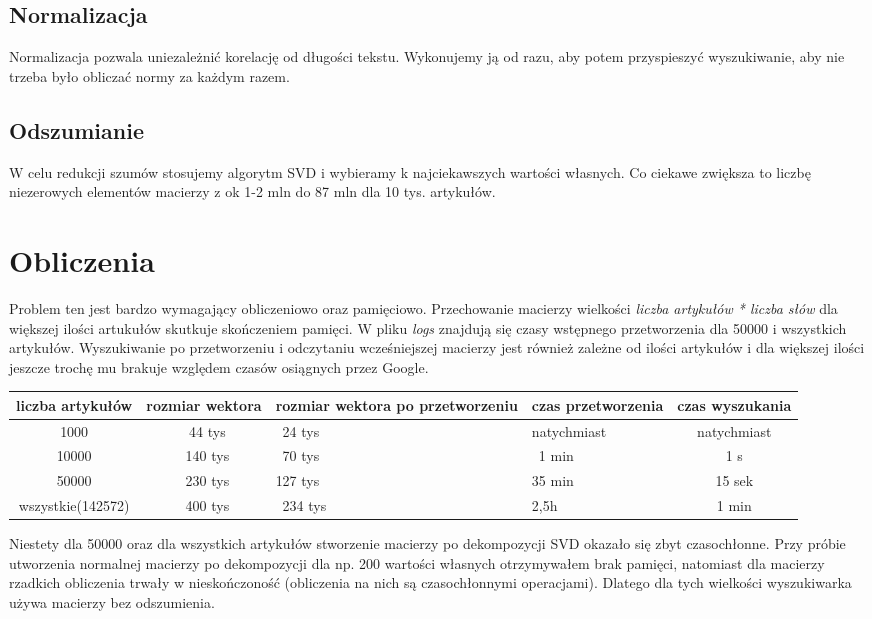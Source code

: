 \documentclass{article}
\begin{document}
\subsection{Normalizacja}
Normalizacja pozwala uniezależnić korelację od długości tekstu. Wykonujemy ją od razu, aby potem przyspieszyć wyszukiwanie, aby nie trzeba było obliczać normy za każdym razem.
\subsection{Odszumianie}
W celu redukcji szumów stosujemy algorytm SVD i wybieramy k najciekawszych wartości własnych. Co ciekawe zwiększa to liczbę niezerowych elementów macierzy z ok 1-2 mln do 87 mln dla 10 tys. artykułów.

\section{Obliczenia}
Problem ten jest bardzo wymagający obliczeniowo oraz pamięciowo. Przechowanie macierzy wielkości \textit{liczba artykułów * liczba słów} dla większej ilości artukułów skutkuje skończeniem pamięci. W pliku \textit{logs} znajdują się czasy wstępnego przetworzenia dla 50000 i wszystkich artykułów. Wyszukiwanie po przetworzeniu i odczytaniu wcześniejszej macierzy jest również zależne od ilości artykułów i dla większej ilości jeszcze trochę mu brakuje względem czasów osiągnych przez Google.

\begin{center}
	\begin{tabular}{c|c|p{1.5cm}|p{1.6cm}|c}
	\centering liczba artykułów & rozmiar wektora & rozmiar wektora po przetworzeniu & czas przetworzenia & czas wyszukania \\ \hline
	1000 & ~44 tys & ~24 tys & natychmiast & natychmiast\\ \hline
	10000 & ~140 tys & ~70 tys & ~1 min & 1 s\\ \hline
	50000 & ~230 tys & 127 tys & 35 min & 15 sek\\ \hline
	wszystkie(142572) & ~400 tys & ~234 tys & 2,5h & 1 min\\
	\end{tabular}
\end{center}

Niestety dla 50000 oraz dla wszystkich artykułów stworzenie macierzy po dekompozycji SVD okazało się zbyt czasochłonne. Przy próbie utworzenia normalnej macierzy po dekompozycji dla np. 200 wartości własnych otrzymywałem brak pamięci, natomiast dla macierzy rzadkich obliczenia trwały w nieskończoność (obliczenia na nich są czasochłonnymi operacjami). Dlatego dla tych wielkości wyszukiwarka używa macierzy bez odszumienia.
\end{document}
